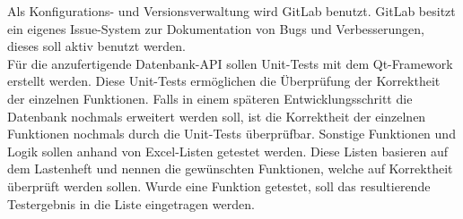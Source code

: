 Als Konfigurations- und Versionsverwaltung wird GitLab benutzt. GitLab besitzt ein eigenes Issue-System zur Dokumentation von Bugs und Verbesserungen, dieses soll aktiv benutzt werden.\\
Für die anzufertigende Datenbank-API sollen Unit-Tests mit dem Qt-Framework erstellt werden. Diese Unit-Tests ermöglichen die Überprüfung der Korrektheit der einzelnen Funktionen. Falls in einem späteren Entwicklungsschritt die Datenbank nochmals erweitert werden soll, ist die Korrektheit der einzelnen Funktionen nochmals durch die Unit-Tests überprüfbar. Sonstige Funktionen und Logik sollen anhand von Excel-Listen getestet werden. Diese Listen basieren auf dem Lastenheft und nennen die gewünschten Funktionen, welche auf Korrektheit überprüft werden sollen. Wurde eine Funktion getestet, soll das resultierende Testergebnis in die Liste eingetragen werden.

